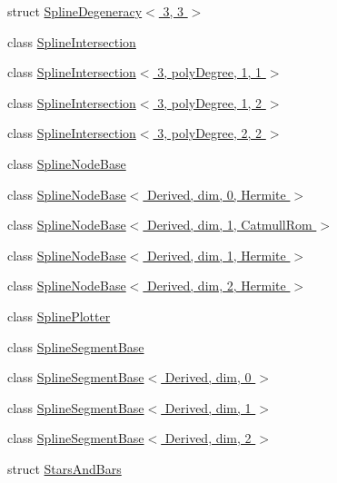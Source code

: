 \begin{DoxyCompactItemize}
\item 
struct \hyperlink{structmodel_1_1_spline_degeneracy_3_013_00_013_01_4}{Spline\+Degeneracy$<$ 3, 3 $>$}
\item 
class \hyperlink{classmodel_1_1_spline_intersection}{Spline\+Intersection}
\item 
class \hyperlink{classmodel_1_1_spline_intersection_3_013_00_01poly_degree_00_011_00_011_01_4}{Spline\+Intersection$<$ 3, poly\+Degree, 1, 1 $>$}
\item 
class \hyperlink{classmodel_1_1_spline_intersection_3_013_00_01poly_degree_00_011_00_012_01_4}{Spline\+Intersection$<$ 3, poly\+Degree, 1, 2 $>$}
\item 
class \hyperlink{classmodel_1_1_spline_intersection_3_013_00_01poly_degree_00_012_00_012_01_4}{Spline\+Intersection$<$ 3, poly\+Degree, 2, 2 $>$}
\item 
class \hyperlink{classmodel_1_1_spline_node_base}{Spline\+Node\+Base}
\item 
class \hyperlink{classmodel_1_1_spline_node_base_3_01_derived_00_01dim_00_010_00_01_hermite_01_4}{Spline\+Node\+Base$<$ Derived, dim, 0, Hermite $>$}
\item 
class \hyperlink{classmodel_1_1_spline_node_base_3_01_derived_00_01dim_00_011_00_01_catmull_rom_01_4}{Spline\+Node\+Base$<$ Derived, dim, 1, Catmull\+Rom $>$}
\item 
class \hyperlink{classmodel_1_1_spline_node_base_3_01_derived_00_01dim_00_011_00_01_hermite_01_4}{Spline\+Node\+Base$<$ Derived, dim, 1, Hermite $>$}
\item 
class \hyperlink{classmodel_1_1_spline_node_base_3_01_derived_00_01dim_00_012_00_01_hermite_01_4}{Spline\+Node\+Base$<$ Derived, dim, 2, Hermite $>$}
\item 
class \hyperlink{classmodel_1_1_spline_plotter}{Spline\+Plotter}
\item 
class \hyperlink{classmodel_1_1_spline_segment_base}{Spline\+Segment\+Base}
\item 
class \hyperlink{classmodel_1_1_spline_segment_base_3_01_derived_00_01dim_00_010_01_4}{Spline\+Segment\+Base$<$ Derived, dim, 0 $>$}
\item 
class \hyperlink{classmodel_1_1_spline_segment_base_3_01_derived_00_01dim_00_011_01_4}{Spline\+Segment\+Base$<$ Derived, dim, 1 $>$}
\item 
class \hyperlink{classmodel_1_1_spline_segment_base_3_01_derived_00_01dim_00_012_01_4}{Spline\+Segment\+Base$<$ Derived, dim, 2 $>$}
\item 
struct \hyperlink{structmodel_1_1_stars_and_bars}{Stars\+And\+Bars}

\end{DoxyCompactItemize}
